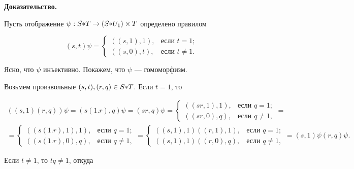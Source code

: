 {\bf Доказательство.}


Пусть отображение $\psi:S{*} T\rightarrow(S{*} U_1)\times T$ определено правилом


$$


(s,t)\psi=


\begin{cases}


((s,1),1), &\text{если } t=1;\\


((s,0),t), &\text{если } t\neq1.


\end{cases}


$$


Ясно, что $\psi$ инъективно. Покажем, что $\psi$ --- гомоморфизм.


Возьмем произвольные $(s,t),(r,q)\in S{*} T$. Если $t=1$, то


\begin{multline*}


((s,1)(r,q))\psi=(s(1.r),q)\psi=(sr,q)\psi=


\begin{cases}


((sr,1),1), &\text{если } q=1;\\


((sr,0),q), &\text{если } q\neq1,


\end{cases}=\\


=


\begin{cases}


((s(1.r),1),1), &\text{если } q=1;\\


((s(1.r),0),q), &\text{если } q\neq1,


\end{cases} =


\begin{cases}


((s,1),1)((r,1),1), &\text{если } q=1;\\


((s,1),1)((r,0),q), &\text{если } q\neq1,


\end{cases}


=(s,1)\psi(r,q)\psi.


\end{multline*}


Если $t\neq1$, то $tq\neq1$, откуда


